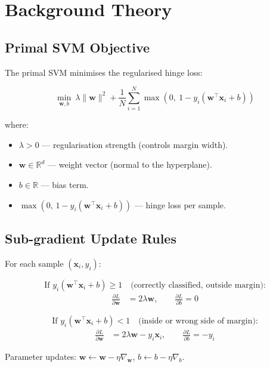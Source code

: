 \documentclass[12pt,a4paper]{article}
\begin{document}
\section{Background Theory}

\subsection{Primal SVM Objective}

The primal SVM minimises the regularised hinge loss:

\begin{equation}
  \min_{\mathbf{w}, b}\ \lambda \|\mathbf{w}\|^2 + \frac{1}{N}\sum_{i=1}^{N} \max\!\left(0,\ 1 - y_i(\mathbf{w}^\top \mathbf{x}_i + b)\right)
  \label{eq:primal}
\end{equation}

where:
\begin{itemize}
  \item $\lambda > 0$ — regularisation strength (controls margin width).
  \item $\mathbf{w} \in \mathbb{R}^d$ — weight vector (normal to the hyperplane).
  \item $b \in \mathbb{R}$ — bias term.
  \item $\max(0,\, 1 - y_i(\mathbf{w}^\top \mathbf{x}_i + b))$ — hinge loss per sample.
\end{itemize}

\subsection{Sub-gradient Update Rules}

For each sample $(\mathbf{x}_i, y_i)$:

\[
\text{If } y_i(\mathbf{w}^\top \mathbf{x}_i + b) \geq 1 \quad\text{(correctly classified, outside margin):}
\]
\begin{align}
  \frac{\partial L}{\partial \mathbf{w}} &= 2\lambda\mathbf{w}, \qquad \frac{\partial L}{\partial b} = 0
\end{align}

\[
\text{If } y_i(\mathbf{w}^\top \mathbf{x}_i + b) < 1 \quad\text{(inside or wrong side of margin):}
\]
\begin{align}
  \frac{\partial L}{\partial \mathbf{w}} &= 2\lambda\mathbf{w} - y_i\mathbf{x}_i, \qquad \frac{\partial L}{\partial b} = -y_i
\end{align}

Parameter updates: $\mathbf{w} \leftarrow \mathbf{w} - \eta \nabla_\mathbf{w}$, \quad $b \leftarrow b - \eta \nabla_b$.
\end{document}
